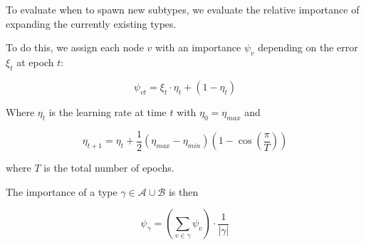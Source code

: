To evaluate when to spawn new subtypes, we evaluate the relative importance of expanding the currently existing types.

To do this, we assign each node $v$ with an importance $\psi_v$ depending on the error $\xi_t$ at epoch $t$:

\[ \psi_{vt} = \xi_t \cdot \eta_t + (1 - \eta_t) \]

Where $\eta_t$ is the learning rate at time $t$ with $\eta_0 = \eta_{max}$ and

\[ \eta_{t+1} = \eta_t + \frac{1}{2} (\eta_{max} - \eta_{min})\left(1 - \cos \left( \frac{\pi}{T}\right)\right) \]

where $T$ is the total number of epochs.

The importance of a type $\gamma \in \mathcal{A} \cup \mathcal{B}$ is then

\[ \psi_\gamma = \left(\sum_{v \in \gamma} \psi_v \right) \cdot \frac{1}{|\gamma|} \]

